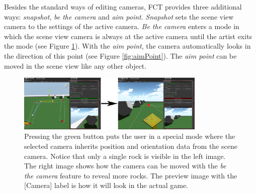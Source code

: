 Besides the standard ways of editing cameras, FCT provides three additional ways: \textit{snapshot}, \textit{be the camera} and \textit{aim point}. \textit{Snapshot} sets the scene view camera to the settings of the active camera. \textit{Be the camera} enters a mode in which the scene view camera is always at the active camera until the artist exits the mode (see Figure \ref{fig:beTheCam}). With the \textit{aim point}, the camera automatically looks in the direction of this point (see Figure \ref{fig:aimPoint}). The \textit{aim point} can be moved in the scene view like any other object.



\begin{figure}[htbp]
\centering
\includegraphics[width=0.8\textwidth]{Pics/beTheCam}
\caption{Pressing the green button puts the user in a special mode where the selected camera inherits position and orientation data from the scene camera. Notice that only a single rock is visible in the left image. The right image shows how the camera can be moved with the \textit{be the camera} feature to reveal more rocks. The preview image with the [Camera] label is how it will look in the actual game.}
\label{fig:beTheCam}
\end{figure}


